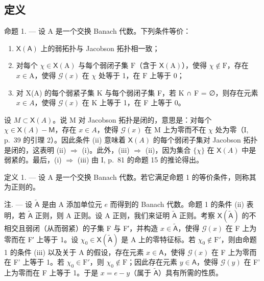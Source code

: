 \subsection{定义}

命题 1. --- 设 A 是一个交换 Banach 代数。下列条件等价：

\begin{enumerate}
\def\labelenumi{(\roman{enumi})}
\item
  \(\mathsf{X}(\mathsf{A})\) 上的弱拓扑与 Jacobson 拓扑相一致；
\item
  对每个 \(\chi \in \mathsf{X}(\mathrm{A})\) 与每个弱闭子集 \(\mathrm{F}\)（含于 \(\mathsf{X}(\mathrm{A})\)），使得 \(\chi \notin \mathrm{F}\)，存在 \(x \in \mathrm{A}\)，使得 \(\mathcal{G}(x)\) 在 \(\chi\) 处等于 1，在 \(\mathrm{F}\) 上等于 0；
\item
  对 X(A) 的每个弱紧子集 K 与每个弱闭子集 F，若 K ∩ F = ∅，则存在元素 \(x \in A\)，使得 \(\mathcal{G}(x)\) 在 K 上等于 1，在 F 上等于 0。
\end{enumerate}

设 \(M \subset \mathsf{X}(A)\)。说 M 对 Jacobson 拓扑是闭的，意思是：对每个 \(\chi \in \mathsf{X}(A) - \mathsf{M}\)，存在 \(x \in A\)，使得 \(\mathcal{G}(x)\) 在 M 上为零而不在 \(\chi\) 处为零（I, p.~39 的引理 2）。因此条件 (ii) 意味着 \(\mathsf{X}(A)\) 的每个弱闭子集对 Jacobson 拓扑是闭的，这表明 (ii) \(\Longrightarrow\) (i)。此外，(iii) \(\Longrightarrow\) (ii)，因为集合 \(\{\chi\}\) 在 \(\mathsf{X}(A)\) 中是弱紧的。最后，(i) \(\Longrightarrow\) (iii) 由 I, p.~81 的命题 15 的推论得出。

定义 1. --- 设 A 是一个交换 Banach 代数。若它满足命题 1 的等价条件，则称其为正则的。

注. --- 设 \(\tilde{\mathsf{A}}\) 是由 A 添加单位元 \(e\) 而得到的 Banach 代数。命题 1 的条件 (ii) 表明，若 \(\tilde{\mathsf{A}}\) 正则，则 A 正则。设 A 正则，我们来证明 \(\tilde{\mathsf{A}}\) 正则。考察 \(\mathsf{X}(\tilde{\mathsf{A}})\) 的不相交且弱闭（从而弱紧）的子集 F 与 F′，并构造 \(x \in \tilde{\mathsf{A}}\)，使得 \(\mathcal{G}(x)\) 在 F 上为零而在 F′ 上等于 1。设 \(\chi_0 \in \mathsf{X}(\tilde{\mathsf{A}})\) 是 A 上的零特征标。若 \(\chi_0 \notin \mathrm{F}'\)，则由命题 1 的条件 (iii) 以及关于 A 的假设，存在元素 \(x \in \mathsf{A}\)，使得 \(\mathcal{G}(x)\) 在 F 上为零而在 F' 上等于 1。若 \(\chi_0 \in \mathrm{F}'\)，则 \(\chi_0 \notin \mathrm{F}\)；因此存在元素 \(y \in \mathsf{A}\)，使得 \(\mathcal{G}(y)\) 在 F' 上为零而在 F 上等于 1。于是 \(x = e - y\)（属于 \(\tilde{\mathsf{A}}\)）具有所需的性质。

